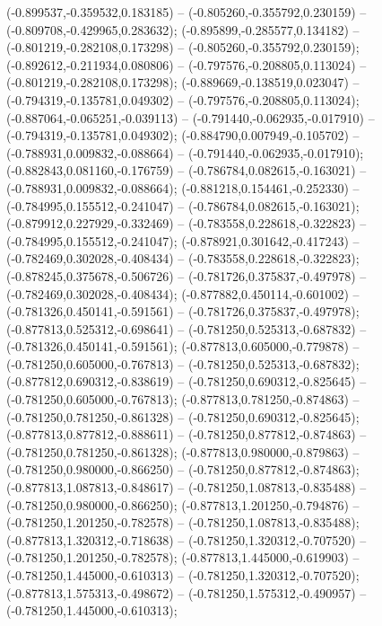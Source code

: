  (-0.899537,-0.359532,0.183185) -- (-0.805260,-0.355792,0.230159) -- (-0.809708,-0.429965,0.283632);
 (-0.895899,-0.285577,0.134182) -- (-0.801219,-0.282108,0.173298) -- (-0.805260,-0.355792,0.230159);
 (-0.892612,-0.211934,0.080806) -- (-0.797576,-0.208805,0.113024) -- (-0.801219,-0.282108,0.173298);
 (-0.889669,-0.138519,0.023047) -- (-0.794319,-0.135781,0.049302) -- (-0.797576,-0.208805,0.113024);
 (-0.887064,-0.065251,-0.039113) -- (-0.791440,-0.062935,-0.017910) -- (-0.794319,-0.135781,0.049302);
 (-0.884790,0.007949,-0.105702) -- (-0.788931,0.009832,-0.088664) -- (-0.791440,-0.062935,-0.017910);
 (-0.882843,0.081160,-0.176759) -- (-0.786784,0.082615,-0.163021) -- (-0.788931,0.009832,-0.088664);
 (-0.881218,0.154461,-0.252330) -- (-0.784995,0.155512,-0.241047) -- (-0.786784,0.082615,-0.163021);
 (-0.879912,0.227929,-0.332469) -- (-0.783558,0.228618,-0.322823) -- (-0.784995,0.155512,-0.241047);
 (-0.878921,0.301642,-0.417243) -- (-0.782469,0.302028,-0.408434) -- (-0.783558,0.228618,-0.322823);
 (-0.878245,0.375678,-0.506726) -- (-0.781726,0.375837,-0.497978) -- (-0.782469,0.302028,-0.408434);
 (-0.877882,0.450114,-0.601002) -- (-0.781326,0.450141,-0.591561) -- (-0.781726,0.375837,-0.497978);
 (-0.877813,0.525312,-0.698641) -- (-0.781250,0.525313,-0.687832) -- (-0.781326,0.450141,-0.591561);
 (-0.877813,0.605000,-0.779878) -- (-0.781250,0.605000,-0.767813) -- (-0.781250,0.525313,-0.687832);
 (-0.877812,0.690312,-0.838619) -- (-0.781250,0.690312,-0.825645) -- (-0.781250,0.605000,-0.767813);
 (-0.877813,0.781250,-0.874863) -- (-0.781250,0.781250,-0.861328) -- (-0.781250,0.690312,-0.825645);
 (-0.877813,0.877812,-0.888611) -- (-0.781250,0.877812,-0.874863) -- (-0.781250,0.781250,-0.861328);
 (-0.877813,0.980000,-0.879863) -- (-0.781250,0.980000,-0.866250) -- (-0.781250,0.877812,-0.874863);
 (-0.877813,1.087813,-0.848617) -- (-0.781250,1.087813,-0.835488) -- (-0.781250,0.980000,-0.866250);
 (-0.877813,1.201250,-0.794876) -- (-0.781250,1.201250,-0.782578) -- (-0.781250,1.087813,-0.835488);
 (-0.877813,1.320312,-0.718638) -- (-0.781250,1.320312,-0.707520) -- (-0.781250,1.201250,-0.782578);
 (-0.877813,1.445000,-0.619903) -- (-0.781250,1.445000,-0.610313) -- (-0.781250,1.320312,-0.707520);
 (-0.877813,1.575313,-0.498672) -- (-0.781250,1.575312,-0.490957) -- (-0.781250,1.445000,-0.610313);
